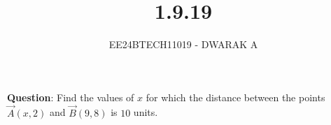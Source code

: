 \documentclass[journal]{IEEEtran}
\begin{document}

\vspace{3cm}

\title{1.9.19}
\author{EE24BTECH11019 - DWARAK A}
{\let\newpage\relax\maketitle}

\renewcommand{\thefigure}{\theenumi}
\renewcommand{\thetable}{\theenumi}
\setlength{\intextsep}{10pt} %


\renewcommand{\thetable}{\theenumi}


\textbf{Question}:
Find the values of $x$ for which the distance between the points $\vec{A}(x, 2)$ and $\vec{B}(9, 8)$ is $10$ units.
\end{document}
